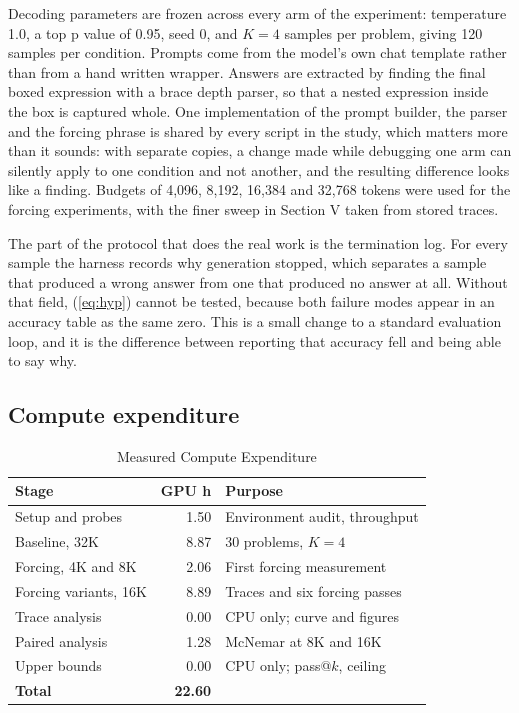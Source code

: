 \documentclass[conference]{IEEEtran}
\begin{document}
Decoding parameters are frozen across every arm of the experiment: temperature
1.0, a top p value of 0.95, seed 0, and $K = 4$ samples per problem, giving 120
samples per condition. Prompts come from the model's own chat template rather
than from a hand written wrapper. Answers are extracted by finding the final
boxed expression with a brace depth parser, so that a nested expression inside the
box is captured whole. One implementation of the prompt builder, the parser and
the forcing phrase is shared by every script in the study, which matters more than
it sounds: with separate copies, a change made while debugging one arm can silently
apply to one condition and not another, and the resulting difference looks like a
finding. Budgets of 4,096, 8,192, 16,384 and 32,768 tokens were used for the
forcing experiments, with the finer sweep in Section V taken from stored traces.

The part of the protocol that does the real work is the termination log. For every
sample the harness records why generation stopped, which separates a sample that
produced a wrong answer from one that produced no answer at all. Without that
field, (\ref{eq:hyp}) cannot be tested, because both failure modes appear in an
accuracy table as the same zero. This is a small change to a standard evaluation
loop, and it is the difference between reporting that accuracy fell and being able
to say why.

\subsection{Compute expenditure}

\begin{table}[t]
\caption{Measured Compute Expenditure}
\label{tab:compute}
\centering
\footnotesize
\begin{tabular}{@{}L{3.1cm}rL{3.4cm}@{}}
\toprule
\textbf{Stage} & \textbf{GPU h} & \textbf{Purpose} \\
\midrule
Setup and probes & 1.50 & Environment audit, throughput \\
Baseline, 32K & 8.87 & 30 problems, $K{=}4$ \\
Forcing, 4K and 8K & 2.06 & First forcing measurement \\
Forcing variants, 16K & 8.89 & Traces and six forcing passes \\
Trace analysis & 0.00 & CPU only; curve and figures \\
Paired analysis & 1.28 & McNemar at 8K and 16K \\
Upper bounds & 0.00 & CPU only; pass@$k$, ceiling \\
\midrule
\textbf{Total} & \textbf{22.60} & \\
\bottomrule
\end{tabular}
\end{table}
\end{document}
